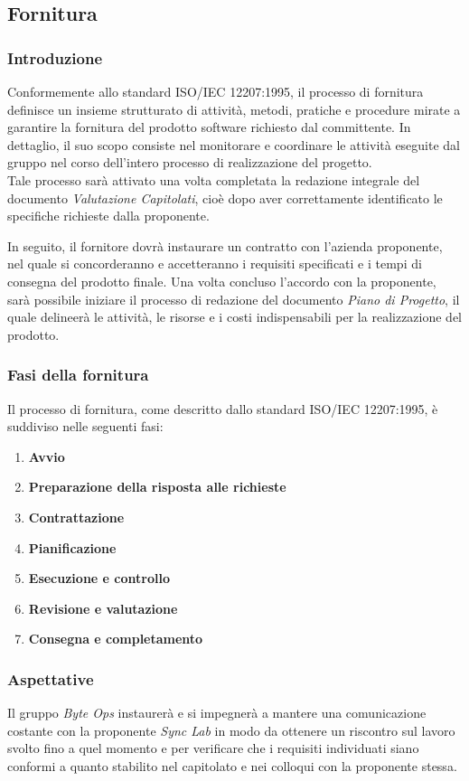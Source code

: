 \subsection{Fornitura}
\subsubsection{Introduzione}
Conformemente allo standard ISO/IEC 12207:1995, il processo di fornitura definisce un insieme strutturato di attività, metodi, pratiche e procedure mirate a garantire la fornitura del prodotto software richiesto dal committente. 
In dettaglio, il suo scopo consiste nel monitorare e coordinare le attività eseguite dal gruppo nel corso dell'intero processo di realizzazione del progetto.\\
Tale processo sarà attivato una volta completata la redazione integrale del documento \textit{Valutazione Capitolati}, cioè dopo aver correttamente identificato le specifiche richieste dalla proponente.

In seguito, il fornitore dovrà instaurare un contratto con l'azienda proponente, nel quale si concorderanno e accetteranno i requisiti specificati e i tempi di consegna del prodotto finale. Una volta concluso l'accordo con la proponente, sarà possibile iniziare il processo di redazione del documento
\textit{Piano di Progetto}, il quale delineerà le attività, le risorse e i costi indispensabili per la realizzazione del prodotto.

\subsubsection{Fasi della fornitura}
Il processo di fornitura, come descritto dallo standard ISO/IEC 12207:1995, è suddiviso nelle seguenti fasi:
\begin{enumerate}
    \item \textbf{Avvio}
    \item \textbf{Preparazione della risposta alle richieste}
    \item \textbf{Contrattazione}
    \item \textbf{Pianificazione}
    \item \textbf{Esecuzione e controllo}
    \item \textbf{Revisione e valutazione}
    \item \textbf{Consegna e completamento}
\end{enumerate}

\subsubsection{Aspettative}
Il gruppo \textit{Byte Ops} instaurerà e si impegnerà a mantere una comunicazione costante con la proponente \textit{Sync Lab} in modo da ottenere un riscontro sul lavoro svolto fino a quel momento e per verificare che i requisiti individuati siano conformi a quanto stabilito nel capitolato e nei colloqui con la proponente stessa.\\

